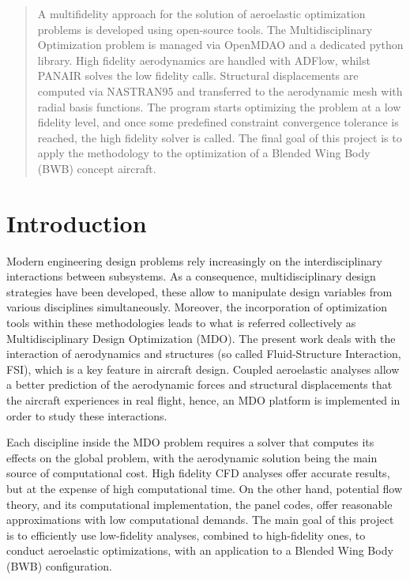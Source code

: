 \begin{abstract}
A multifidelity approach for the solution of aeroelastic optimization problems is developed using open-source tools. The Multidisciplinary Optimization problem is managed via OpenMDAO and a dedicated python library. High fidelity aerodynamics are handled with ADFlow, whilst PANAIR solves the low fidelity calls. Structural displacements are computed via NASTRAN95 and transferred to the aerodynamic mesh with radial basis functions. The program starts optimizing the problem at a low fidelity level, and once some predefined constraint convergence tolerance is reached, the high fidelity solver is called.  The final goal of this project is to apply the methodology to the optimization of a Blended Wing Body (BWB) concept aircraft. 

\end{abstract}

\printnomenclature


\section{Introduction}
\label{sec:introduction}

Modern engineering design problems rely increasingly on the interdisciplinary interactions between subsystems. As a consequence, multidisciplinary design strategies have been developed, these allow to manipulate design variables from various disciplines simultaneously. Moreover, the incorporation of optimization tools within these methodologies leads to what is referred collectively as Multidisciplinary Design Optimization (MDO).    
The present work deals with the interaction of aerodynamics and structures (so called Fluid-Structure Interaction, FSI), which is a key feature in aircraft design. Coupled aeroelastic analyses allow a better prediction of the aerodynamic forces and structural displacements that the aircraft experiences in real flight, hence, an MDO platform is implemented in order to study these interactions. \par 
Each discipline inside the MDO problem requires a solver that computes its effects on the global problem, with the aerodynamic solution being the main source of computational cost. High fidelity CFD analyses offer accurate results, but at the expense of high computational time. On the other hand, potential flow theory, and its computational implementation, the panel codes, offer reasonable approximations with low computational demands. The main goal of this project is to efficiently use low-fidelity analyses, combined to high-fidelity ones, to conduct aeroelastic optimizations, with an application to a Blended Wing Body (BWB) configuration.  
